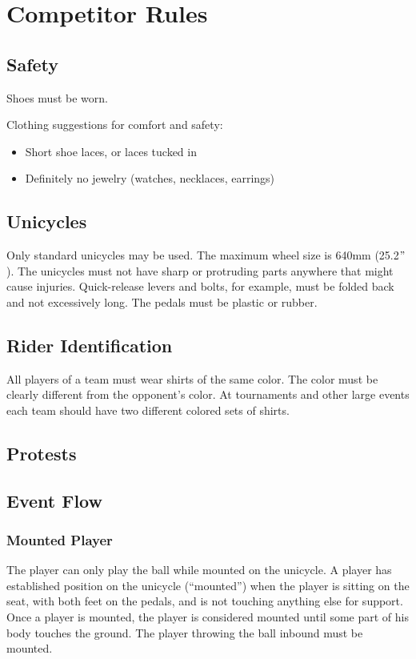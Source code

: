\chapter{Competitor Rules}

\section{Safety}

Shoes must be worn.

Clothing suggestions for comfort and safety:
\begin{itemize}
\item Short shoe laces, or laces tucked in
\item Definitely no jewelry (watches, necklaces, earrings)
\end{itemize}

\section{Unicycles}

Only standard unicycles may be used. The maximum wheel size is 640mm (25.2$"$).
The unicycles must not have sharp or protruding parts anywhere that might
cause injuries.
Quick-release levers and bolts, for example, must be folded back and not excessively long.
The pedals must be plastic or rubber.

\section{Rider Identification}

All players of a team must wear shirts of the same color.
The color must be clearly different from the opponent's color.
At tournaments and other large events each team should have two different colored sets of shirts.

\section{Protests}

\section{Event Flow}

\subsection{Mounted Player}
The player can only play the ball while mounted on the unicycle.
A player has established position on the unicycle (``mounted'') when the player is sitting on the seat, with both feet on the pedals, and is not touching anything else for support.
Once a player is mounted, the player is considered mounted until some part of his body touches the ground.
The player throwing the ball inbound must be mounted.

